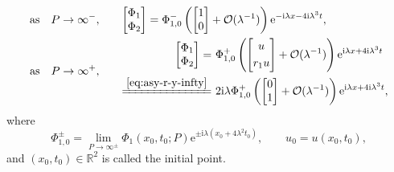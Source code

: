 \documentclass[11pt,reqno]{amsart}
\newcommand{\ii}{\mathrm{i}}
\newcommand{\ee}{\mathrm{e}}
\numberwithin{equation}{section}
\begin{document}
\begin{subequations}\label{eq:limitation-Phi}
    \begin{align}
	\text{as}\quad P\rightarrow \infty^{-},\qquad 
	&\begin{aligned}
	\begin{bmatrix}
	\Phi_{1}  \\
	\Phi_{2}
	\end{bmatrix}
	=
	\Phi_{1,0}^{-}\left(\begin{bmatrix}
			1\\
			0
		\end{bmatrix}+\mathcal{O}(\lambda^{-1})\right)\ee^{-\ii  \lambda x-4\ii \lambda^3 t},
		\end{aligned} \label{eq:limitation-Phi-n}\\
	\text{as}\quad P\rightarrow \infty^{+},\qquad 
		&\begin{aligned}	
			\begin{bmatrix}
				\Phi_{1}\\
				\Phi_{2}
			\end{bmatrix}=
			&\ \Phi_{1,0}^{+}
			\left(\begin{bmatrix}
				u\\[3pt]
				r_1u
			\end{bmatrix}+\mathcal{O}(\lambda^{-1})\right)\ee^{\ii  \lambda x+4\ii \lambda^3 t}\\
			\xlongequal{\eqref{eq:asy-r-y-infty}}&\ 2\ii \lambda\Phi_{1,0}^{+}\left(\begin{bmatrix}
				0   \\ 	1	\end{bmatrix}+\mathcal{O}(\lambda^{-1})\right)\ee^{\ii  \lambda x+4\ii \lambda^3 t}, 
		\end{aligned}\label{eq:limitation-Phi-p}
	\end{align}
\end{subequations}
where 
\begin{equation}\label{eq:Phi-lim-infty-initial}
	\Phi_{1,0}^{\pm}=\lim_{P\rightarrow \infty^{\pm}}\Phi_{1}(x_0,t_0;P)\ee^{\pm\ii\lambda(x_0+4\lambda^2 t_0)}, \qquad 
	u_0=u(x_0,t_0), 
\end{equation}
and $(x_0,t_0)\in \mathbb{R}^2$ is called the initial point. 
\end{document}
